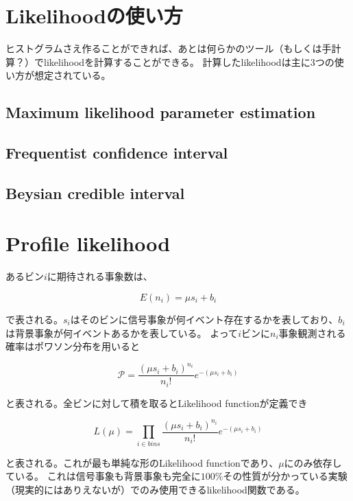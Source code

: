 \section{Likelihoodの使い方}

ヒストグラムさえ作ることができれば、あとは何らかのツール（もしくは手計算？）でlikelihoodを計算することができる。
計算したlikelihoodは主に3つの使い方が想定されている。

\subsection{Maximum likelihood parameter estimation}
\subsection{Frequentist confidence interval}
\subsection{Beysian credible interval}

\section{Profile likelihood}

あるビン$i$に期待される事象数は、

\begin{equation}
E(n_i) = \mu s_i + b_i
\end{equation}

で表される。$s_i$はそのビンに信号事象が何イベント存在するかを表しており、$b_i$は背景事象が何イベントあるかを表している。
よって$i$ビンに$n_i$事象観測される確率はポワソン分布を用いると

\begin{equation}
\mathcal{P} = \frac{(\mu s_i+b_i)^{n_i}}{n_i!}e^{-(\mu s_i+b_i)}
\end{equation}

と表される。全ビンに対して積を取るとLikelihood functionが定義でき

\begin{equation}
L(\mu)=\prod_{i\in bins} \frac{(\mu s_i+b_i)^{n_i}}{n_i!}e^{-(\mu s_i+b_i)}
\end{equation}

と表される。これが最も単純な形のLikelihood functionであり、$\mu$にのみ依存している。
これは信号事象も背景事象も完全に$100\%$その性質が分かっている実験（現実的にはありえないが）でのみ使用できるlikelihood関数である。\\

